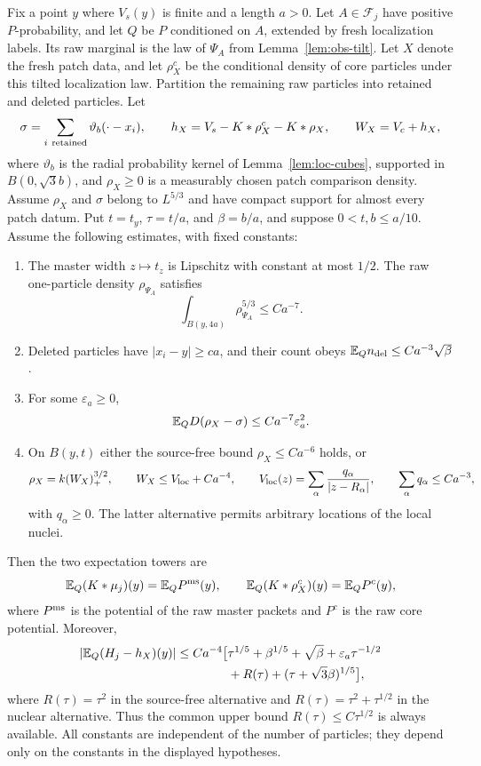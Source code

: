 \begin{lemma}\label{lem:obs-transfer}
Fix a point $y$ where $V_s(y)$ is finite and a length $a>0$.
Let $A\in\mathcal F_j$ have positive $P$-probability, and let $Q$
be $P$ conditioned on $A$, extended by fresh localization labels.
Its raw marginal is the law of $\Psi_A$ from
Lemma~\ref{lem:obs-tilt}. Let $X$ denote the fresh patch data,
and let $\rho_X^c$ be the conditional density of core particles
under this tilted localization law. Partition the remaining raw
particles into retained and deleted particles. Let
\[
 \sigma=\sum_{i\ {\rm retained}}\vartheta_b(\cdot-x_i),\qquad
 h_X=V_s-K*\rho_X^c-K*\rho_X,\qquad W_X=V_c+h_X,
\]
where $\vartheta_b$ is the radial probability kernel of
Lemma~\ref{lem:loc-cubes}, supported in $B(0,\sqrt3b)$, and
$\rho_X\ge0$ is a measurably chosen patch comparison density.
Assume $\rho_X$ and
$\sigma$ belong to $L^{5/3}$ and have compact support for almost
every patch datum. Put $t=t_y$, $\tau=t/a$, and $\beta=b/a$,
and suppose $0<t,b\le a/10$. Assume the following estimates, with
fixed constants:
\begin{enumerate}
\item The master width $z\mapsto t_z$ is Lipschitz with constant
at most $1/2$. The raw one-particle density $\rho_{\Psi_A}$ satisfies
\[
 \int_{B(y,4a)}\rho_{\Psi_A}^{5/3}\le Ca^{-7}.
\]
\item Deleted particles have $|x_i-y|\ge ca$, and their count obeys
$\mathbb E_Q n_{\rm del}\le Ca^{-3}\sqrt\beta$.
\item For some $\varepsilon_a\ge0$,
\[
 \mathbb E_Q D(\rho_X-\sigma)\le Ca^{-7}\varepsilon_a^2.
\]
\item On $B(y,t)$ either the source-free bound
$\rho_X\le Ca^{-6}$ holds, or
\[
 \rho_X=k(W_X)_+^{3/2},\qquad
 W_X\le V_{\rm loc}+Ca^{-4},\qquad
 V_{\rm loc}(z)=\sum_\alpha\frac{q_\alpha}{|z-R_\alpha|},
 \qquad\sum_\alpha q_\alpha\le Ca^{-3},
\]
with $q_\alpha\ge0$. The latter alternative permits arbitrary
locations of the local nuclei.
\end{enumerate}
Then the two expectation towers are
\begin{equation}\label{eq:obs-two-towers}
 \mathbb E_Q(K*\mu_j)(y)=\mathbb E_Q P^{\rm ms}(y),\qquad
 \mathbb E_Q(K*\rho_X^c)(y)=\mathbb E_Q P^c(y),
\end{equation}
where $P^{\rm ms}$ is the potential of the raw master packets and
$P^c$ is the raw core potential. Moreover,
\begin{equation}\label{eq:obs-transfer}
 \begin{split}
 |\mathbb E_Q(H_j-h_X)(y)|\le Ca^{-4}\big[&
    \tau^{1/5}+\beta^{1/5}+\sqrt\beta
      +\varepsilon_a\tau^{-1/2}\\
    &+R(\tau)+(\tau+\sqrt3\beta)^{1/5}\big],
 \end{split}
\end{equation}
where $R(\tau)=\tau^2$ in the source-free alternative and
$R(\tau)=\tau^2+\tau^{1/2}$ in the nuclear alternative.
Thus the common upper bound $R(\tau)\le C\tau^{1/2}$ is always
available. All constants are independent of the number of particles;
they depend only on the constants in the displayed hypotheses.
\end{lemma}

